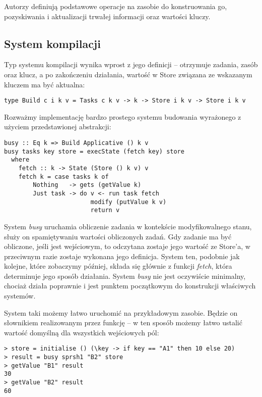 Autorzy definiują podstawowe operacje na zasobie do konstruowania go, pozyskiwania i aktualizacji trwałej informacji oraz wartości kluczy.

\subsection{System kompilacji}

Typ systemu kompilacji wynika wprost z jego definicji -- otrzymuje zadania, zasób oraz klucz, a po zakończeniu działania, wartość w Store związana ze wskazanym kluczem ma być aktualna:

\begin{lstlisting}
type Build c i k v = Tasks c k v -> k -> Store i k v -> Store i k v
\end{lstlisting}

\pagebreak

Rozważmy implementację bardzo prostego systemu budowania wyrażonego z użyciem przedstawionej abstrakcji:

\begin{lstlisting}
busy :: Eq k => Build Applicative () k v
busy tasks key store = execState (fetch key) store
  where
    fetch :: k -> State (Store () k v) v
    fetch k = case tasks k of
        Nothing   -> gets (getValue k)
        Just task -> do v <- run task fetch
                        modify (putValue k v)
                        return v
\end{lstlisting}

System \textit{busy} uruchamia obliczenie zadania w kontekście modyfikowalnego stanu, służy on spamiętywaniu wartości obliczonych zadań. Gdy zadanie ma być obliczone, jeśli jest wejściowym, to odczytana zostaje jego wartość ze Store'a, w przeciwnym razie zostaje wykonana jego definicja. System ten, podobnie jak kolejne, które zobaczymy później, składa się głównie z funkcji \textit{fetch}, która determinuje jego sposób działania. System \textit{busy} nie jest oczywiście minimalny, chociaż działa poprawnie i jest punktem początkowym do konstrukcji właściwych systemów.

System taki możemy łatwo uruchomić na przykładowym zasobie. Będzie on słownikiem realizowanym przez funkcję -- w ten sposób możemy łatwo ustalić wartość domyślną dla wszystkich wejściowych pól:

\begin{lstlisting}
> store = initialise () (\key -> if key == "A1" then 10 else 20)
> result = busy sprsh1 "B2" store
> getValue "B1" result
30
> getValue "B2" result
60
\end{lstlisting}

